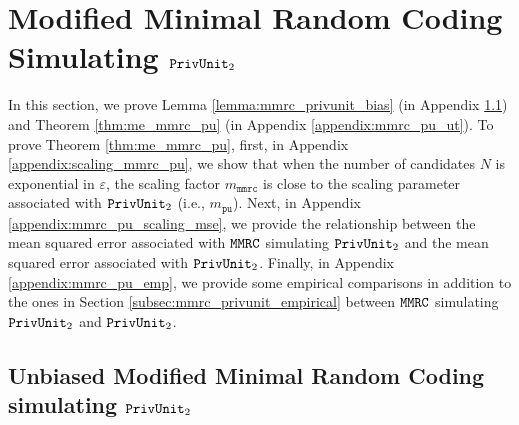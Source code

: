 \section{Modified Minimal Random Coding Simulating \texorpdfstring{$\texttt{PrivUnit}_2$}{PrivUnit}}
\label{appendix:mmrc_pu}
In this section, we prove Lemma \ref{lemma:mmrc_privunit_bias} (in Appendix \ref{appendix:mmrc_pu_debias}) and Theorem \ref{thm:me_mmrc_pu} (in Appendix \ref{appendix:mmrc_pu_ut}). To prove Theorem \ref{thm:me_mmrc_pu}, first, in Appendix \ref{appendix:scaling_mmrc_pu}, we show that when the number of candidates $N$ is exponential in $\varepsilon$, the scaling factor $m_{\texttt{mmrc}}$ is close to the scaling parameter associated with $\texttt{PrivUnit}_2$ (i.e., $m_{\texttt{pu}}$). Next, in Appendix \ref{appendix:mmrc_pu_scaling_mse}, we provide the relationship between the mean squared error associated with $\texttt{MMRC}$ simulating $\texttt{PrivUnit}_2$ and the mean squared error associated with $\texttt{PrivUnit}_2$.
Finally, in Appendix \ref{appendix:mmrc_pu_emp}, we provide some empirical comparisons in addition to the ones in Section \ref{subsec:mmrc_privunit_empirical} between $\texttt{MMRC}$ simulating $\texttt{PrivUnit}_2$ and $\texttt{PrivUnit}_2$.


\subsection{Unbiased Modified Minimal Random Coding simulating \texorpdfstring{$\texttt{PrivUnit}_2$}{PrivUnit}}\label{appendix:mmrc_pu_debias}

